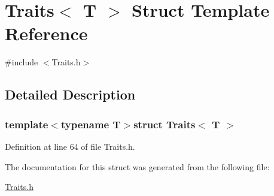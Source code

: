 \hypertarget{struct_traits}{\section{Traits$<$ T $>$ Struct Template Reference}
\label{struct_traits}
}


{\ttfamily \#include $<$Traits.\-h$>$}



\subsection{Detailed Description}
\subsubsection*{template$<$typename T$>$struct Traits$<$ T $>$}



Definition at line 64 of file Traits.\-h.



The documentation for this struct was generated from the following file\-:\begin{DoxyCompactItemize}
\item 
\hyperlink{_traits_8h}{Traits.\-h}\end{DoxyCompactItemize}
